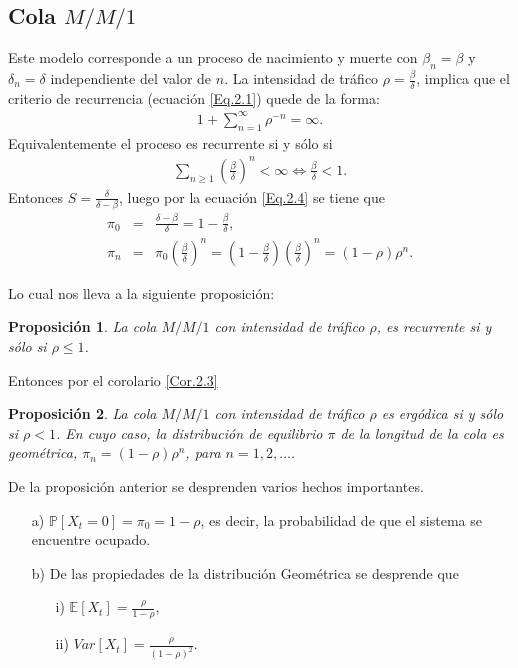 \documentclass{article}
\newtheorem{Prop}{Proposición}[section]
\newcommand{\esp}{\mathbb{E}}
\newcommand{\prob}{\mathbb{P}}
\numberwithin{equation}{section}
\begin{document}
\subsection{Cola $M/M/1$}
%
Este modelo corresponde a un proceso de nacimiento y muerte con $\beta_{n}=\beta$ y $\delta_{n}=\delta$ independiente del valor de $n$. La intensidad de tr\'afico $\rho=\frac{\beta}{\delta}$, implica que el criterio de recurrencia (ecuaci\'on \ref{Eq.2.1}) quede de la forma:
\begin{eqnarray*}
1+\sum_{n=1}^{\infty}\rho^{-n}=\infty.
\end{eqnarray*}
Equivalentemente el proceso es recurrente si y s\'olo si
\begin{eqnarray*}
\sum_{n\geq1}\left(\frac{\beta}{\delta}\right)^{n}<\infty\Leftrightarrow \frac{\beta}{\delta}<1.
\end{eqnarray*}
Entonces
$S=\frac{\delta}{\delta-\beta}$, luego por la ecuaci\'on \ref{Eq.2.4} se tiene que
\begin{eqnarray*}
\pi_{0}&=&\frac{\delta-\beta}{\delta}=1-\frac{\beta}{\delta},\\
\pi_{n}&=&\pi_{0}\left(\frac{\beta}{\delta}\right)^{n}=\left(1-\frac{\beta}{\delta}\right)\left(\frac{\beta}{\delta}\right)^{n}=\left(1-\rho\right)\rho^{n}.
\end{eqnarray*}


Lo cual nos lleva a la siguiente proposici\'on:

\begin{Prop}
La cola $M/M/1$ con intensidad de tr\'afico $\rho$, es recurrente si y s\'olo si $\rho\leq1$.
\end{Prop}

Entonces por el corolario \ref{Cor.2.3}

\begin{Prop}
La cola $M/M/1$ con intensidad de tr\'afico $\rho$ es erg\'odica si y s\'olo si $\rho<1$. En cuyo caso, la distribuci\'on de equilibrio $\pi$ de la longitud de la cola es geom\'etrica, $\pi_{n}=\left(1-\rho\right)\rho^{n}$, para $n=1,2,\ldots$.
\end{Prop}

De la proposici\'on anterior se desprenden varios hechos importantes.
\begin{itemize}
\item[a) ] $\prob\left[X_{t}=0\right]=\pi_{0}=1-\rho$, es decir, la probabilidad de que el sistema se encuentre ocupado.
\item[b) ] De las propiedades de la distribuci\'on Geom\'etrica se desprende que
\begin{itemize}
\item[i) ] $\esp\left[X_{t}\right]=\frac{\rho}{1-\rho}$,
\item[ii) ] $Var\left[X_{t}\right]=\frac{\rho}{\left(1-\rho\right)^{2}}$.
\end{itemize}
\end{itemize}
\end{document}

